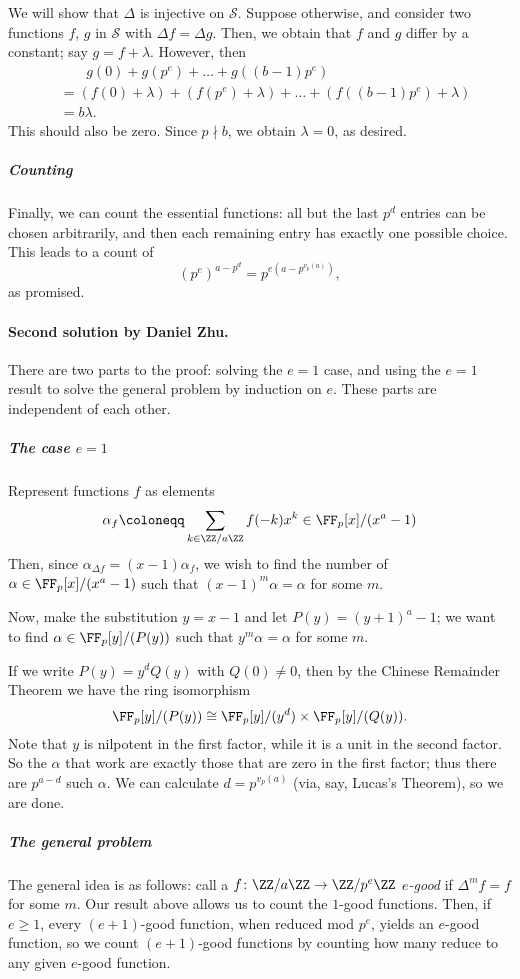 \documentclass[11pt]{scrartcl}
\begin{document}
We will show that $\Delta$ is injective on $\mathcal S$.
Suppose otherwise, and consider two functions $f$, $g$ in $\mathcal S$ with $\Delta f = \Delta g$.
Then, we obtain that $f$ and $g$ differ by a constant; say $g = f + \lambda$.
However, then
\begin{align*}
  & \phantom{=}\;\; g(0) + g(p^e) + \dots + g((b-1)p^e)\\
  & = (f(0) + \lambda) + (f(p^e) + \lambda) + \dots + (f((b-1)p^e) + \lambda)\\
  & = b\lambda.
\end{align*}
This should also be zero. Since $p \nmid b$, we obtain $\lambda = 0$, as desired.

\subparagraph{Counting} Finally, we can count the essential functions:
all but the last $p^d$ entries can be chosen arbitrarily,
and then each remaining entry has exactly one possible choice.
This leads to a count of
\[ (p^e)^{a - p^d} = p^{e(a - p^{\nu_p(a)})}, \]
as promised.

\paragraph{Second solution by Daniel Zhu.}
There are two parts to the proof:
solving the $e = 1$ case, and using the $e=1$ result to solve the general problem
by induction on $e$. These parts are independent of each other.

\subparagraph{The case $e = 1$}
Represent functions $f$ as elements
\[ \alpha_f \coloneqq
  \sum_{k \in \ZZ/a\ZZ} f(-k)x^k \in \FF_p[x]/(x^a - 1) \]
Then, since $\alpha_{\Delta f} = (x - 1) \alpha_f$,
we wish to find the number of $\alpha \in \FF_p[x]/(x^a - 1)$
such that $(x-1)^m\alpha = \alpha$ for some $m$.

Now, make the substitution $y = x - 1$ and let $P(y) = (y+1)^a - 1$;
we want to find $\alpha \in \FF_p[y]/(P(y))$ such that $y^m\alpha = \alpha$ for some $m$.

If we write $P(y) = y^d Q(y)$ with $Q(0) \neq 0$,
then by the Chinese Remainder Theorem we have the ring isomorphism
\[ \FF_p[y]/(P(y)) \cong \FF_p[y]/(y^d) \times \FF_p[y]/(Q(y)). \]
Note that $y$ is nilpotent in the first factor,
while it is a unit in the second factor.
So the $\alpha$ that work are exactly those that are zero in the first factor;
thus there are $p^{a-d}$ such $\alpha$.
We can calculate $d = p^{v_p(a)}$ (via, say, Lucas's Theorem), so we are done.

\subparagraph{The general problem}
The general idea is as follows:
call a $f \colon \ZZ/a\ZZ \to \ZZ/p^e\ZZ$ \emph{$e$-good}
if $\Delta^m f = f$ for some $m$.
Our result above allows us to count the $1$-good functions.
Then, if $e \geq 1$, every $(e+1)$-good function, when reduced mod $p^e$,
yields an $e$-good function, so we count $(e+1)$-good functions by counting
how many reduce to any given $e$-good function.
\end{document}

